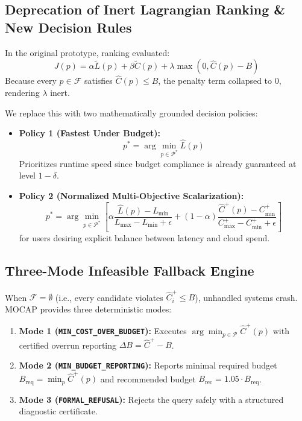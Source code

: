 \documentclass[journal,10pt,onecolumn]{article}
\begin{document}
\subsection{Deprecation of Inert Lagrangian Ranking \& New Decision Rules}
In the original prototype, ranking evaluated:
\begin{equation}
    J(p) = \alpha \tilde{L}(p) + \beta \tilde{C}(p) + \lambda \max(0, \hat{C}(p) - B)
\end{equation}
Because every $p \in \mathcal{F}$ satisfies $\hat{C}(p) \le B$, the penalty term collapsed to $0$, rendering $\lambda$ inert.

We replace this with two mathematically grounded decision policies:
\begin{itemize}
    \item \textbf{Policy 1 (Fastest Under Budget):}
    \begin{equation}
        p^* = \arg\min_{p \in \mathcal{P}^*} \hat{L}(p)
    \end{equation}
    Prioritizes runtime speed since budget compliance is already guaranteed at level $1 - \delta$.
    \item \textbf{Policy 2 (Normalized Multi-Objective Scalarization):}
    \begin{equation}
        p^* = \arg\min_{p \in \mathcal{P}^*} \left[ \alpha \frac{\hat{L}(p) - L_{\min}}{L_{\max} - L_{\min} + \epsilon} + (1 - \alpha) \frac{\hat{C}^+(p) - C_{\min}^+}{C_{\max}^+ - C_{\min}^+ + \epsilon} \right]
    \end{equation}
    for users desiring explicit balance between latency and cloud spend.
\end{itemize}

\subsection{Three-Mode Infeasible Fallback Engine}
When $\mathcal{F} = \emptyset$ (i.e., every candidate violates $\hat{C}_i^+ \le B$), unhandled systems crash. MOCAP provides three deterministic modes:
\begin{enumerate}
    \item \textbf{Mode 1 (\texttt{MIN\_COST\_OVER\_BUDGET}):} Executes $\arg\min_{p \in \mathcal{P}} \hat{C}^+(p)$ with certified overrun reporting $\Delta B = \hat{C}^+ - B$.
    \item \textbf{Mode 2 (\texttt{MIN\_BUDGET\_REPORTING}):} Reports minimal required budget $B_{\text{req}} = \min_{p} \hat{C}^+(p)$ and recommended budget $B_{\text{rec}} = 1.05 \cdot B_{\text{req}}$.
    \item \textbf{Mode 3 (\texttt{FORMAL\_REFUSAL}):} Rejects the query safely with a structured diagnostic certificate.
\end{enumerate}
\end{document}
